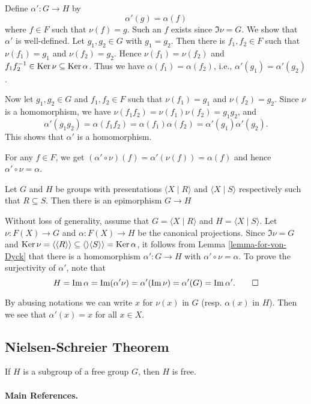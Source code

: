 \begin{sketch}
	Define $\alpha':G\to H$ by 
	\begin{equation*}
		\alpha'(g) = \alpha(f)
	\end{equation*}
	where $f \in F$ such that $\nu(f) = g$. Such an $f$ exists since $\Im \nu  = G$. We show that $\alpha'$ is well-defined.  Let $g_1, g_2\in G$ with $g_1 = g_2$. Then there is $f_1,f_2\in F$ such that $\nu(f_1) = g_1$ and $\nu(f_2) = g_2$. Hence $\nu(f_1) = \nu(f_2)$ and $f_1f_2^{-1}\in\Ker \nu\subseteq \Ker \alpha$. Thus we have $\alpha(f_1) = \alpha(f_2)$, i.e., $\alpha'(g_1) = \alpha'(g_2)$. 
	
	Now let $g_1, g_2 \in G$ and $f_1, f_2 \in F$ such that $\nu(f_1) = g_1$ and $\nu(f_2) = g_2$. Since $\nu$ is a homomorphism, we have $\nu(f_1f_2) = \nu(f_1)\nu(f_2) = g_1g_2$, and
	\begin{equation*}
		\alpha'(g_1g_2) = \alpha(f_1f_2) =  \alpha(f_1)\alpha(f_2) = 	\alpha'(g_1) \alpha'(g_2).
	\end{equation*}
	This shows that $\alpha'$ is a homomorphism.
	
	For any $f\in F$, we get $(\alpha'\circ \nu)(f) = \alpha'(\nu(f)) = \alpha(f)$ and hence $\alpha'\circ \nu = \alpha$.
\end{sketch}
\begin{theorem} \label{thm-Van-Dyck}
	Let $G$ and $H$ be groups with presentations $\langle X\mid R\rangle$ and $\langle X\mid S \rangle$ respectively such that $R\subseteq S$. Then there is an epimorphism $G\to H$ 
\end{theorem}
\begin{sketch}
	Without loss of generality, assume that $G = \langle X\mid R\rangle$ and $H =\langle X\mid S\rangle$. Let $\nu:F(X)\to G$ and $\alpha:F(X)\to  H$ be the canonical projections. Since $\Im \nu = G$ and $\Ker \nu = \langle\langle R\rangle\rangle \subseteq \langle\rangle\langle S\rangle\rangle = \Ker \alpha$, it follows from Lemma \ref{lemma-for-von-Dyck} that there is a homomorphism $\alpha':G\to H$ with $\alpha'\circ\nu = \alpha$. To prove the surjectivity of $\alpha'$, note that 
	\begin{equation*}
		H = \Im \alpha = \Im (\alpha'\nu) = \alpha'(\Im \nu) = \alpha'(G) = \Im \alpha'. \qedhere
	\end{equation*}
\end{sketch}
\begin{remark}
	By abusing notations we can write $x$ for $\nu(x)$ in $G$ (resp. $\alpha(x)$ in $H$). Then we see that $\alpha'(x) =x$ for all $x\in X$.  
\end{remark}
\subsection{Nielsen-Schreier Theorem}
\begin{theorem}
	If $H$ is a subgroup of a free group $G$, then $H$ is free.
\end{theorem}



\paragraph{Main References.} \cite{Lang2002,Bergman2015,Johnson1997,Ribes2010}